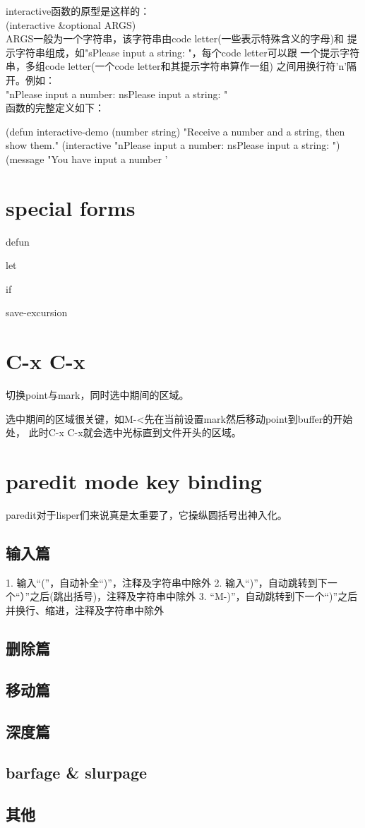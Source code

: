 ﻿\documentclass[a4paper,11pt]{article}
\begin{document}
  interactive函数的原型是这样的：\\
  (interactive \&optional ARGS)\\
  ARGS一般为一个字符串，该字符串由code letter(一些表示特殊含义的字母)和
  提示字符串组成，如"sPlease input a string: "，每个code letter可以跟
  一个提示字符串，多组code letter(一个code letter和其提示字符串算作一组)
  之间用换行符'\bs n'隔开。例如：\\
  "nPlease input a number: \bs nsPlease input a string: "\\
  函数的完整定义如下：\\
  \begin{schemecode}
(defun interactive-demo (number string)
  "Receive a number and a string, then show them."
  (interactive "nPlease input a number: \bs nsPlease input a string: ")
  (message "You have input a number '%
  \end{schemecode}

  \section[special forms]{special forms}
  defun

  let

  if

  save-excursion

  \section[C-x C-x]{C-x C-x}
  切换point与mark，同时选中期间的区域。

  选中期间的区域很关键，如M-<先在当前设置mark然后移动point到buffer的开始处，
  此时C-x C-x就会选中光标直到文件开头的区域。

  \section[paredit mode key binding]{paredit mode key binding}
  paredit对于lisper们来说真是太重要了，它操纵圆括号出神入化。
  \subsection[输入篇]{输入篇}
  1. 输入“(”，自动补全“)”，注释及字符串中除外
  2. 输入“)”，自动跳转到下一个“）”之后(跳出括号)，注释及字符串中除外
  3. “M-)”，自动跳转到下一个“)”之后并换行、缩进，注释及字符串中除外
  

  \subsection[删除篇]{删除篇}

  \subsection[移动篇]{移动篇}

  \subsection[深度篇]{深度篇}

  \subsection[barfage \& slurpage]{barfage \& slurpage}
  
  \subsection[其他]{其他}
  
\end{document}
